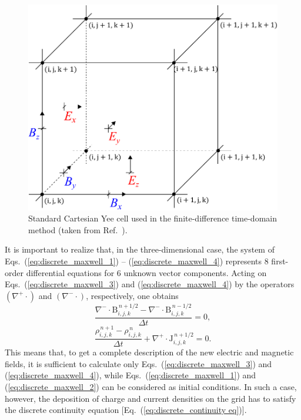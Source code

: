 \documentclass[10pt, a4paper, twoside, openright]{report}
\renewcommand{\vec}[1]{\boldsymbol{\mathrm{#1}}}
\begin{document}
\begin{figure}[t]
	\includegraphics[width=0.35\paperwidth]{./img/yee.pdf}
	\caption[]{\label{fig:yee_lattice} Standard Cartesian Yee cell used in the finite-difference time-domain method (taken from Ref.~).}
\end{figure}

It is important to realize that, in the three-dimensional case, the system of Eqs.~(\ref{eq:discrete_maxwell_1}) -- (\ref{eq:discrete_maxwell_4}) represents 8 first-order differential equations for 6 unknown vector components. Acting on Eqs.~(\ref{eq:discrete_maxwell_3}) and (\ref{eq:discrete_maxwell_4}) by the operators $ \left(\nabla^{+}\cdot\right) $ and $ \left(\nabla^{-}\cdot\right) $, respectively, one obtains
\begin{equation}\label{eq:discrete_eq_for_B}
	\frac{\nabla^{-} \cdot \vec{B}_{i, j, k}^{\,n + 1/2} - \nabla^{-} \cdot \vec{B}_{i, j, k}^{\,n - 1/2}}{\Delta t} = 0,
\end{equation}
\begin{equation}\label{eq:discrete_continuity eq}
	\frac{\rho_{i, j, k}^{\,n + 1} - \rho_{i, j, k}^{\,n}}{\Delta t} + \nabla^{+} \cdot \vec{J}_{i, j, k}^{\,n + 1/2} = 0.
\end{equation}
This means that, to get a complete description of the new electric and magnetic fields, it is sufficient to calculate only Eqs.~(\ref{eq:discrete_maxwell_3}) and (\ref{eq:discrete_maxwell_4}), while Eqs.~(\ref{eq:discrete_maxwell_1}) and (\ref{eq:discrete_maxwell_2}) can be considered as initial conditions. In such a case, however, the deposition of charge and current densities on the grid has to satisfy the discrete continuity equation [Eq.~(\ref{eq:discrete_continuity eq})].
\end{document}
